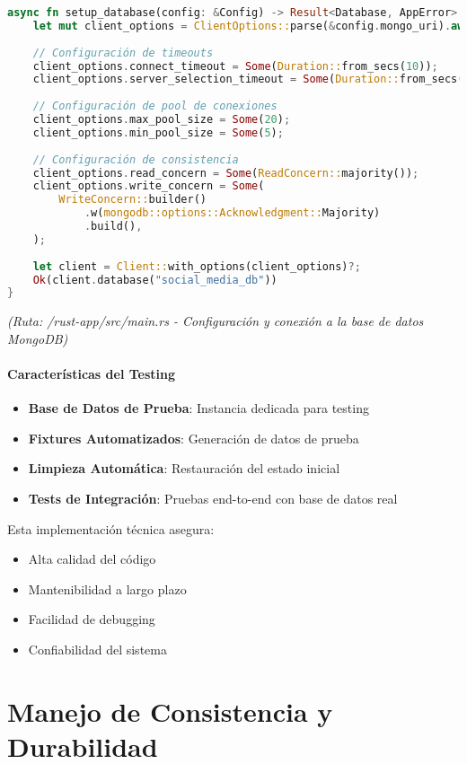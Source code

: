 \documentclass[12pt,letterpaper]{article}
\begin{document}
\begin{lstlisting}[language=rust]
async fn setup_database(config: &Config) -> Result<Database, AppError> {
    let mut client_options = ClientOptions::parse(&config.mongo_uri).await?;
    
    // Configuración de timeouts
    client_options.connect_timeout = Some(Duration::from_secs(10));
    client_options.server_selection_timeout = Some(Duration::from_secs(15));
    
    // Configuración de pool de conexiones
    client_options.max_pool_size = Some(20);
    client_options.min_pool_size = Some(5);
    
    // Configuración de consistencia
    client_options.read_concern = Some(ReadConcern::majority());
    client_options.write_concern = Some(
        WriteConcern::builder()
            .w(mongodb::options::Acknowledgment::Majority)
            .build(),
    );
    
    let client = Client::with_options(client_options)?;
    Ok(client.database("social_media_db"))
}
\end{lstlisting}
\textit{(Ruta: /rust-app/src/main.rs - Configuración y conexión a la base de datos MongoDB)}

\paragraph{Características del Testing}
\begin{itemize}
    \item \textbf{Base de Datos de Prueba}: Instancia dedicada para testing
    \item \textbf{Fixtures Automatizados}: Generación de datos de prueba
    \item \textbf{Limpieza Automática}: Restauración del estado inicial
    \item \textbf{Tests de Integración}: Pruebas end-to-end con base de datos real
\end{itemize}

Esta implementación técnica asegura:
\begin{itemize}
    \item Alta calidad del código
    \item Mantenibilidad a largo plazo
    \item Facilidad de debugging
    \item Confiabilidad del sistema
\end{itemize}
\section{Manejo de Consistencia y Durabilidad}
\end{document}
